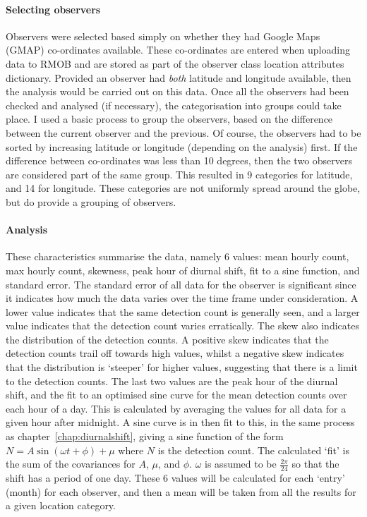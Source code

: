 \paragraph{Selecting observers\\}
Observers were selected based simply on whether they had Google Maps (GMAP) co-ordinates available. These co-ordinates are entered when uploading data to RMOB and are stored as part of the observer class location attributes dictionary. Provided an observer had {\it both} latitude and longitude available, then the analysis would be carried out on this data. Once all the observers had been checked and analysed (if necessary), the categorisation into groups could take place.
I used a basic process to group the observers, based on the difference between the current observer and the previous. Of course, the observers had to be sorted by increasing latitude or longitude (depending on the analysis) first. If the difference between co-ordinates was less than 10 degrees, then the two observers are considered part of the same group. This resulted in 9 categories for latitude, and 14 for longitude. These categories are not uniformly spread around the globe, but do provide a grouping of observers.
\paragraph{Analysis\\}
These characteristics summarise the data, namely 6 values: mean hourly count, max hourly count, skewness, peak hour of diurnal shift, fit to a sine function, and standard error. The standard error of all data for the observer is significant since it indicates how much the data varies over the time frame under consideration. A lower value indicates that the same detection count is generally seen, and a larger value indicates that the detection count varies erratically. The skew also indicates the distribution of the detection counts. A positive skew indicates that the detection counts trail off towards high values, whilst a negative skew indicates that the distribution is `steeper' for higher values, suggesting that there is a limit to the detection counts. The last two values are the peak hour of the diurnal shift, and the fit to an optimised sine curve for the mean detection counts over each hour of a day. This is calculated by averaging the values for all data for a given hour after midnight. A sine curve is in then fit to this, in the same process as chapter~\ref{chap:diurnalshift}, giving a sine function of the form $N = A \sin \left( \omega t + \phi \right) + \mu$ where $N$ is the detection count. The calculated `fit' is the sum of the covariances for $A$, $\mu$, and $\phi$. $\omega$ is assumed to be $\frac{2\pi}{24}$ so that the shift has a period of one day.
These 6 values will be calculated for each `entry' (month) for each observer, and then a mean will be taken from all the results for a given location category.

